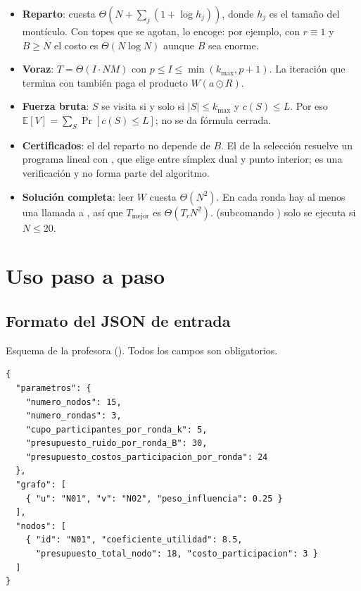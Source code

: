 \documentclass[11pt,a4paper]{article}
\begin{document}
\begin{itemize}[nosep]
\item \textbf{Reparto}: cuesta $\Theta(N+\sum_j(1+\log h_j))$, donde $h_j$ es el tamaño del montículo. Con topes que se agotan,  lo encoge: por ejemplo, con $r\equiv1$ y $B\ge N$ el costo es $\Theta(N\log N)$ aunque $B$ sea enorme.
\item \textbf{Voraz}: $T=\Theta(I\cdot NM)$ con $p\le I\le\min(k_{\max},p+1)$. La iteración que termina con  también paga el producto $W(a\odot R)$.
\item \textbf{Fuerza bruta}: $S$ se visita si y solo si $|S|\le k_{\max}$ y $c(S)\le L$. Por eso $\mathbb E[V]=\sum_S\Pr[c(S)\le L]$; no se da fórmula cerrada.
\item \textbf{Certificados}: el del reparto no depende de $B$. El de la selección resuelve un programa lineal con , que elige entre símplex dual y punto interior; es una verificación y no forma parte del algoritmo.
\item \textbf{Solución completa}: leer $W$ cuesta $\Theta(N^2)$. En cada ronda hay al menos una llamada a , así que $T_{\text{mejor}}$ es $\Theta(T_rN^2)$.  (subcomando ) solo se ejecuta si $N\le20$.
\end{itemize}

\section{Uso paso a paso}\label{sec:uso}

\subsection{Formato del JSON de entrada}

Esquema de la profesora (). Todos los campos son obligatorios.

\begin{lstlisting}
{
  "parametros": {
    "numero_nodos": 15,
    "numero_rondas": 3,
    "cupo_participantes_por_ronda_k": 5,
    "presupuesto_ruido_por_ronda_B": 30,
    "presupuesto_costos_participacion_por_ronda": 24
  },
  "grafo": [
    { "u": "N01", "v": "N02", "peso_influencia": 0.25 }
  ],
  "nodos": [
    { "id": "N01", "coeficiente_utilidad": 8.5,
      "presupuesto_total_nodo": 18, "costo_participacion": 3 }
  ]
}
\end{lstlisting}
\end{document}
